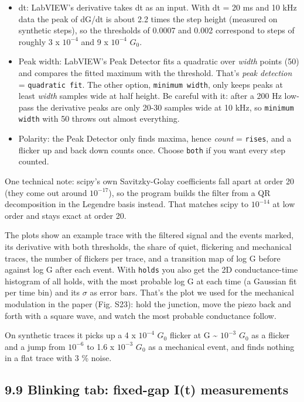\documentclass[
  11pt,
  a4paper,
]{article}
\providecommand{\tightlist}{%
  \setlength{\itemsep}{0pt}\setlength{\parskip}{0pt}}
\begin{document}
\begin{itemize}
\tightlist
\item
  dt: LabVIEW's derivative takes dt as an input. With dt = 20 ms and 10
  kHz data the peak of dG/dt is about 2.2 times the step height
  (measured on synthetic steps), so the thresholds of 0.0007 and 0.002
  correspond to steps of roughly 3 x $10^{-4}$ and 9 x $10^{-4}$ $G_0$.
\item
  Peak width: LabVIEW's Peak Detector fits a quadratic over \emph{width}
  points (50) and compares the fitted maximum with the threshold. That's
  \emph{peak detection} = \texttt{quadratic fit}. The other option,
  \texttt{minimum width}, only keeps peaks at least \emph{width} samples
  wide at half height. Be careful with it: after a 200 Hz low-pass the
  derivative peaks are only 20-30 samples wide at 10 kHz, so
  \texttt{minimum width} with 50 throws out almost everything.
\item
  Polarity: the Peak Detector only finds maxima, hence \emph{count} =
  \texttt{rises}, and a flicker up and back down counts once. Choose
  \texttt{both} if you want every step counted.
\end{itemize}

One technical note: scipy's own Savitzky-Golay coefficients fall apart
at order 20 (they come out around $10^{-17}$), so the program builds the
filter from a QR decomposition in the Legendre basis instead. That
matches scipy to $10^{-14}$ at low order and stays exact at order 20.

The plots show an example trace with the filtered signal and the events
marked, its derivative with both thresholds, the share of quiet,
flickering and mechanical traces, the number of flickers per trace, and
a transition map of log G before against log G after each event. With
\texttt{holds} you also get the 2D conductance-time histogram of all
holds, with the most probable log G at each time (a Gaussian fit per
time bin) and its $\sigma$ as error bars. That's the plot we used for
the mechanical modulation in the paper (Fig. S23): hold the junction,
move the piezo back and forth with a square wave, and watch the most
probable conductance follow.

On synthetic traces it picks up a 4 x $10^{-4}$ $G_0$ flicker at G
\textasciitilde{} $10^{-3}$ $G_0$ as a flicker and a jump from $10^{-6}$
to 1.6 x $10^{-3}$ $G_0$ as a mechanical event, and finds nothing in a
flat trace with 3 \% noise.

\hypertarget{blinking-tab-fixed-gap-it-measurements}{%
\subsection{9.9 Blinking tab: fixed-gap I(t)
measurements}\label{blinking-tab-fixed-gap-it-measurements}}
\end{document}
